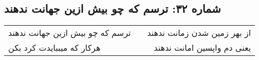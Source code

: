 \begin{center}
\section*{شماره ۳۲: ترسم که چو بیش ازین جهانت ندهند}
\label{sec:032}
\begin{longtable}{l p{0.5cm} r}
ترسم که چو بیش ازین جهانت ندهند
&&
از بهر زمین شدن زمانت ندهند
\\
هرکار که میببایدت کرد بکن
&&
یعنی دم واپسین امانت ندهند
\\
\end{longtable}
\end{center}
